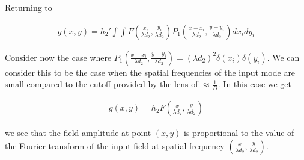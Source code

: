 \documentclass[12pt]{article}
\begin{document}
Returning to

\begin{align}
g(x,y) = h_2'\int \int F\left(\frac{x_i}{\lambda d_2},\frac{y_i}{\lambda d_2}\right) P_1\left(\frac{x-x_i}{\lambda d_2},\frac{y-y_i}{\lambda d_2}\right)dx_idy_i
\end{align}

Consider now the case where $P_1\left(\frac{x-x_i}{\lambda d_2},\frac{y-y_i}{\lambda d_2}\right) = (\lambda d_2)^2\delta(x_i)\delta(y_i)$. We can consider this to be the case when the spatial frequencies of the input mode are small compared to the cutoff provided by the lens of $\approx \frac{1}{D}$. In this case we get

\begin{align}
g(x,y) = h_2 F\left(\frac{x}{\lambda d_2},\frac{y}{\lambda d_2}\right)
\end{align}

we see that the field amplitude at point $(x,y)$ is proportional to the value of the Fourier transform of the input field at spatial frequency $\left(\frac{x}{\lambda d_2},\frac{y}{\lambda d_2}\right)$.
\end{document}
